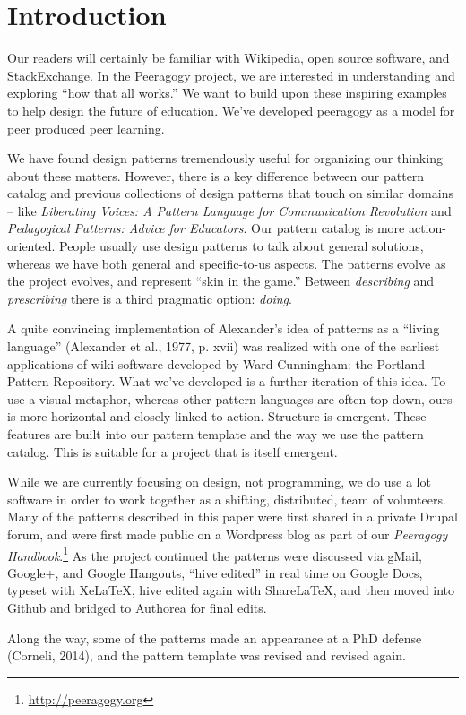 \section{Introduction}

Our readers will certainly be familiar with Wikipedia, open source software, and StackExchange.  In the Peeragogy project, we are interested in understanding and exploring ``how that all works.''    We want to build upon these inspiring examples to help design the future of education.  We've developed peeragogy as a model for peer produced peer learning.

We have found design patterns tremendously useful for organizing our thinking about these matters.  However, there is a key difference between our pattern catalog and previous collections of design patterns that touch on similar domains -- like \emph{Liberating Voices: A Pattern Language for Communication Revolution} and \emph{Pedagogical Patterns: Advice for Educators}.  Our pattern catalog is more action-oriented.  People usually use design patterns to talk about general solutions, whereas we have both general and specific-to-us aspects. The patterns evolve as the project evolves, and represent ``skin in the game.''   Between \emph{describing} and \emph{prescribing} there is a third pragmatic option: \emph{doing}.  

A quite convincing implementation of Alexander’s idea of patterns as a ``living language'' (Alexander et al., 1977, p. xvii) was realized with one of the earliest applications of wiki software developed by Ward Cunningham: the Portland Pattern Repository. What we've developed is a further iteration of this idea. To use a visual metaphor, whereas other pattern languages are often top-down, ours is more horizontal and closely linked to action.  Structure is emergent.  These features are built into our pattern template and the way we use the pattern catalog.  This is suitable for a project that is itself emergent.

While we are currently focusing on design, not programming, we do use a lot software in order to work together as a shifting, distributed, team of volunteers.  Many of the patterns described in this paper were first shared in a private Drupal forum, and were first made public on a Wordpress blog as part of our \emph{Peeragogy Handbook}.\footnote{\url{http://peeragogy.org}}  As the project continued the patterns were discussed via gMail, Google+, and Google Hangouts, ``hive edited'' in real time on Google Docs, typeset with XeLaTeX, hive edited again with ShareLaTeX, and then moved into Github and bridged to Authorea for final edits.

Along the way, some of the patterns made an appearance at a PhD defense (Corneli, 2014), and the pattern template was revised and revised again.  

